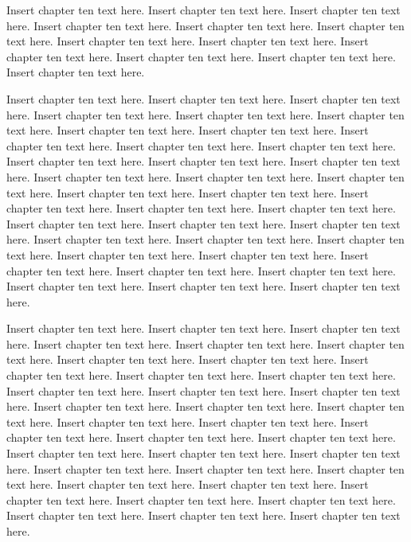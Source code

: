 Insert chapter ten text here. Insert chapter ten text here. Insert chapter ten text here. Insert chapter ten text here. Insert chapter ten text here. Insert chapter ten text here. Insert chapter ten text here. Insert chapter ten text here. Insert chapter ten text here. Insert chapter ten text here. Insert chapter ten text here. Insert chapter ten text here.

Insert chapter ten text here. Insert chapter ten text here. Insert chapter ten text here. Insert chapter ten text here. Insert chapter ten text here. Insert chapter ten text here. Insert chapter ten text here. Insert chapter ten text here. Insert chapter ten text here. Insert chapter ten text here. Insert chapter ten text here. Insert chapter ten text here. Insert chapter ten text here. Insert chapter ten text here. Insert chapter ten text here. Insert chapter ten text here. Insert chapter ten text here. Insert chapter ten text here. Insert chapter ten text here. Insert chapter ten text here. Insert chapter ten text here. Insert chapter ten text here. Insert chapter ten text here. Insert chapter ten text here. Insert chapter ten text here. Insert chapter ten text here. Insert chapter ten text here. Insert chapter ten text here. Insert chapter ten text here. Insert chapter ten text here. Insert chapter ten text here. Insert chapter ten text here. Insert chapter ten text here. Insert chapter ten text here. Insert chapter ten text here. Insert chapter ten text here.

Insert chapter ten text here. Insert chapter ten text here. Insert chapter ten text here. Insert chapter ten text here. Insert chapter ten text here. Insert chapter ten text here. Insert chapter ten text here. Insert chapter ten text here. Insert chapter ten text here. Insert chapter ten text here. Insert chapter ten text here. Insert chapter ten text here. Insert chapter ten text here. Insert chapter ten text here. Insert chapter ten text here. Insert chapter ten text here. Insert chapter ten text here. Insert chapter ten text here. Insert chapter ten text here. Insert chapter ten text here. Insert chapter ten text here. Insert chapter ten text here. Insert chapter ten text here. Insert chapter ten text here. Insert chapter ten text here. Insert chapter ten text here. Insert chapter ten text here. Insert chapter ten text here. Insert chapter ten text here. Insert chapter ten text here. Insert chapter ten text here. Insert chapter ten text here. Insert chapter ten text here. Insert chapter ten text here. Insert chapter ten text here. Insert chapter ten text here.


